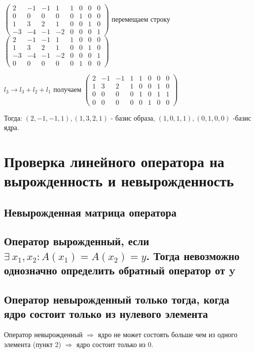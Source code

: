 \documentclass[12pt]{article}
\begin{document}
$\left(\begin{array}{cccc|cccc}
            2  & -1 & -1 & 1  & 1 & 0 & 0 & 0 \\
            0  & 0  & 0  & 0  & 0 & 1 & 0 & 0 \\
            1  & 3  & 2  & 1  & 0 & 0 & 1 & 0 \\
            -3 & -4 & -1 & -2 & 0 & 0 & 0 & 1
        \end{array} \right)$ перемещаем строку $\left(\begin{array}{cccc|cccc}
            2  & -1 & -1 & 1  & 1 & 0 & 0 & 0 \\
            1  & 3  & 2  & 1  & 0 & 0 & 1 & 0 \\
            -3 & -4 & -1 & -2 & 0 & 0 & 0 & 1 \\
            0  & 0  & 0  & 0  & 0 & 1 & 0 & 0
        \end{array} \right)$

$l_3 \rightarrow l_3 + l_2 + l_1$ получаем $\left(\begin{array}{cccc|cccc}
            2 & -1 & -1 & 1 & 1 & 0 & 0 & 0 \\
            1 & 3  & 2  & 1 & 0 & 0 & 1 & 0 \\
            0 & 0  & 0  & 0 & 1 & 0 & 1 & 1 \\
            0 & 0  & 0  & 0 & 0 & 1 & 0 & 0
        \end{array} \right)$

Тогда: $(2,-1,-1,1), (1,3,2,1)$ - базис образа, $(1,0,1,1),(0,1,0,0)$ -базис ядра.

\section{Проверка линейного оператора на вырожденность и невырожденность}
\subsection{Невырожденная матрица оператора}
\subsection{Оператор вырожденный, если $\exists\ x_1, x_2 : A(x_1) = A(x_2) = y$. Тогда невозможно однозначно определить обратный оператор от y}
\subsection{Оператор невырожденный только тогда, когда ядро состоит только из нулевого элемента}
Оператор невырожденный $\Rightarrow$ ядро не может состоять больше чем из одного элемента (пункт 2) $\Rightarrow$ ядро состоит только из 0.
\end{document}

